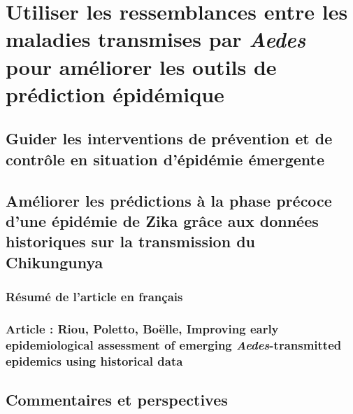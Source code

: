 \chapter{Utiliser les ressemblances entre les maladies transmises par {\em Aedes} pour améliorer les outils de prédiction épidémique}

\section{Guider les interventions de prévention et de contrôle en situation d'épidémie émergente}

\section{Améliorer les prédictions à la phase précoce d'une épidémie de Zika grâce aux données historiques sur la transmission du Chikungunya}

\subsection{Résumé de l'article en français}

\subsection{Article : Riou, Poletto, Boëlle, Improving early epidemiological assessment of emerging {\em Aedes}-transmitted epidemics using historical data}

%

\section{Commentaires et perspectives}
\sectionmark{ }
